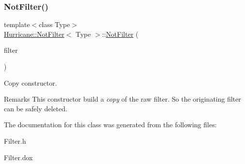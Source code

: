 \subsubsection{\texorpdfstring{Not\+Filter()}{NotFilter()}\hspace{0.1cm}{\footnotesize\ttfamily [2/2]}}
{\footnotesize\ttfamily template$<$class Type$>$ \\
\mbox{\hyperlink{classHurricane_1_1NotFilter}{Hurricane\+::\+Not\+Filter}}$<$ Type $>$\+::\mbox{\hyperlink{classHurricane_1_1NotFilter}{Not\+Filter}} (\begin{DoxyParamCaption}\item[{const \mbox{\hyperlink{classHurricane_1_1NotFilter}{Not\+Filter}}$<$ Type $>$ \&}]{filter }\end{DoxyParamCaption})\hspace{0.3cm}{\ttfamily [inline]}}

Copy constructor.

\begin{DoxyRemark}{Remarks}
This constructor build a {\itshape copy} of the raw filter. So the originating filter can be safely deleted. 
\end{DoxyRemark}


The documentation for this class was generated from the following files\+:\begin{DoxyCompactItemize}
\item 
Filter.\+h\item 
Filter.\+dox\end{DoxyCompactItemize}
